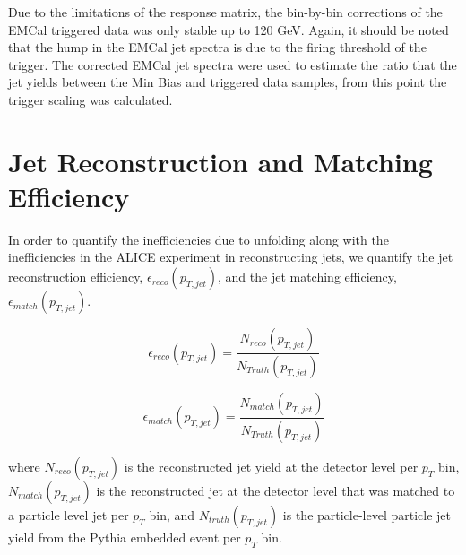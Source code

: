 
Due to the limitations of the response matrix, the bin-by-bin corrections of the EMCal triggered data was only stable up to 120 GeV.  Again, it should be noted that the hump in the EMCal jet spectra is due to the firing threshold of the trigger.  The corrected EMCal jet spectra were used to estimate the ratio that the jet yields between the Min Bias and triggered data samples, from this point the trigger scaling was calculated.  

\section{Jet Reconstruction and Matching Efficiency}
In order to quantify the inefficiencies due to unfolding along with the inefficiencies in the ALICE experiment in reconstructing jets, we quantify the jet reconstruction efficiency, $\epsilon_{reco} (p_{T, jet})$, and the jet matching efficiency, $\epsilon_{match} (p_{T, jet})$.

\begin{equation}
 \epsilon_{reco} (p_{T, jet}) = \frac{N_{reco}(p_{T, jet}) }{N_{Truth} (p_{T, jet})}
\label{eq:jetrecoeff}
\end{equation}

\begin{equation}
 \epsilon_{match} (p_{T, jet}) = \frac{N_{match}(p_{T, jet}) }{N_{Truth}(p_{T, jet})}
\label{eq:jetmatchoeff}
\end{equation}

\noindent 
where $N_{reco} (p_{T, jet})$ is the reconstructed jet yield at the detector level per $p_{T}$ bin, $N_{match}(p_{T, jet})$ is the reconstructed jet at the detector level that was matched to a particle level jet per $p_{T}$ bin, and $N_{truth} (p_{T, jet})$ is the particle-level particle jet yield from the Pythia embedded event per $p_{T}$ bin.  

